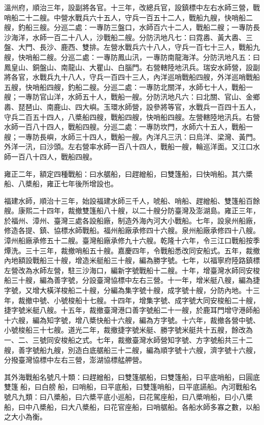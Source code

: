 \begin{pinyinscope}
溫州府，順治三年，設副將各官。十三年，改總兵官，設鎮標中左右水師三營，戰哨船二十二艘。中營水戰兵六十五人，守兵一百五十二人，戰船九艘，快哨船二艘，釣船三艘。分巡二處：一專防三盤口，水師百六十二人，戰船二艘；一專防長沙海洋，水師一百二十八人，沙戰船二艘。分防汛地凡七：曰霓嶴、黃大嶴、三盤、大門、長沙、鹿西、雙排。左營水戰兵六十八人，守兵一百七十三人，戰船九艘，快哨船二艘。分巡二處：一專防鳳山汛，一專防南龍海洋。分防汛地凡五：曰鳳皇山、銅盤山、南龍山、大瞿山、白腦門。右營轄陸地汛兵。瑞安水師營，設副將各官，水戰兵九十八人，守兵一百四十三人，內洋巡哨戰船四艘，外洋巡哨戰船五艘，快哨船四艘，釣船二艘。分巡二處：一專防北關洋，水師七十人，戰船一艘；一專防官山洋，水師五十人，戰船一艘。分防汛地凡六：曰北關、官山、金鄉嶴、琵琶山、南鹿山、四大嶼。玉環水師營，設參將等官，水戰兵一百四十五人，守兵二百五十四人，八槳船四艘，戰船四艘，快哨船四艘。左營轄陸地汛兵。右營水師一百八十四人，戰船四艘。分巡二處：一專防坎門，水師六十五人，戰船一艘；一專防長嶼，水師三十四人，戰船一艘。內洋凡三汛：曰烏洋、梁灣、黃門。外洋一汛，曰沙頭。左右營率水師一百八十四人，戰船一艘，輪巡洋面。又江口水師一百八十四人，戰船四艘。

雍正二年，額定四種戰船：曰水艍船，曰趕繒船，曰雙篷船，曰快哨船。其六槳船、八槳船，雍正七年後所增設也。

福建水師，順治十三年，始設福建水師三千人，唬船、哨船、趕繒船、雙篷船百餘艘。康熙二十四年，裁撤雙篷船八十艘，以二十艘分防臺灣及澎湖島。雍正三年，於福州、漳州、臺灣三處各設船廠，制造外海內河大小戰船。七年，設泉州船廠，修造各提、鎮、協標水師戰船。福州船廠承修四十六艘。泉州船廠承修四十八艘。漳州船廠承修五十二艘。臺灣船廠承修九十六艘。乾隆十六年，令三江口戰船按季燂洗。三十三年，裁撤哨船五十艘。嘉慶四年，令戰船悉改同安船式。五年，裁撤內地額設戰船三十艘，增造米艇船三十艘，編為勝字號。七年，以福寧府陸路鎮標左營改為水師左營，駐三沙海口，編新字號戰船十二艘。十年，增臺灣水師同安梭船三十艘，編為善字號，分設臺灣協標中左右三營。十一年，增米艇八艘，編為捷字號，又增大橫洋梭船二十艘，分編為集字號十艘，成字號十艘，分防內地。十三年，裁撤中號、小號梭船十七艘。十四年，增集字號、成字號大同安梭船二十艘，捷字號米艇八艘。十五年，裁撤臺灣港口善字號船二十一艘，於鹿耳門增守港師船十六艘，編為知字號，增八槳快船十六艘，編為方字號。十六年，裁撤各營中號、小號梭船三十七艘。道光二年，裁撤捷字號米艇、勝字號米艇共十五艘，餘改為一、二、三號同安梭船之式。七年，裁撤臺灣水師營知字號、方字號船共三十二艘，善字號船九艘，別造白底艍船三十二艘，編為順字號十六艘，濟字號十六艘，分撥臺灣協標中左右三營，澎湖協標艋舺營。

其外海戰船名號凡十類：曰趕繒船，曰雙篷艍船，曰雙篷船，曰平底哨船，曰圓底雙篷船，曰白艕船，曰哨船，曰平底船，曰雙篷哨船，曰平底讌船。內河戰船名號凡九類：曰八槳船，曰六槳平底小巡船，曰花駕座船，曰八槳哨船，曰小八槳船，曰中八槳船，曰大八槳船，曰花官座船，曰哨艍船。各船水師多寡之數，以船之大小為衡。


\end{pinyinscope}
